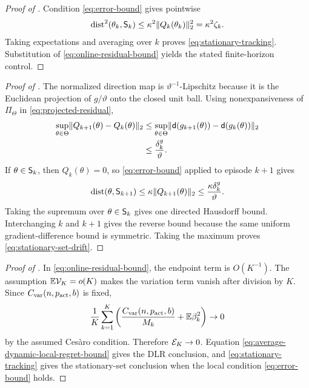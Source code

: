\begin{proof}[Proof of ]
Condition \eqref{eq:error-bound} gives pointwise
\[
 \operatorname{dist}^2(\theta_k,\mathsf S_k)
 \le\kappa^2\lVert Q_k(\theta_k)\rVert_2^2
 =\kappa^2\zeta_k.
\]
Taking expectations and averaging over $k$ proves \eqref{eq:stationary-tracking}.  Substitution of \eqref{eq:online-residual-bound} yields the stated finite-horizon control.
\end{proof}

\begin{proof}[Proof of ]
The normalized direction map is $\vartheta^{-1}$-Lipschitz because it is the Euclidean projection of $g/\vartheta$ onto the closed unit ball.  Using nonexpansiveness of $\Pi_\Theta$ in \eqref{eq:projected-residual},
\begin{align*}
 \sup_{\theta\in\Theta}
 \lVert Q_{k+1}(\theta)-Q_k(\theta)\rVert_2
 &\le
 \sup_{\theta\in\Theta}
 \lVert\mathsf d(g_{k+1}(\theta))-\mathsf d(g_k(\theta))\rVert_2\\
 &\le\frac{\delta_k^g}{\vartheta}.
\end{align*}
If $\theta\in\mathsf S_k$, then $Q_k(\theta)=0$, so \eqref{eq:error-bound} applied to episode $k+1$ gives
\[
 \operatorname{dist}(\theta,\mathsf S_{k+1})
 \le\kappa\lVert Q_{k+1}(\theta)\rVert_2
 \le\frac{\kappa\delta_k^g}{\vartheta}.
\]
Taking the supremum over $\theta\in\mathsf S_k$ gives one directed Hausdorff bound.  Interchanging $k$ and $k+1$ gives the reverse bound because the same uniform gradient-difference bound is symmetric.  Taking the maximum proves \eqref{eq:stationary-set-drift}.
\end{proof}

\begin{proof}[Proof of ]
In \eqref{eq:online-residual-bound}, the endpoint term is $O(K^{-1})$.  The assumption $\mathbb E\mathcal V_K=o(K)$ makes the variation term vanish after division by $K$.  Since $C_{\rm var}(n,p_{\rm act},b)$ is fixed,
\[
 \frac1K\sum_{k=1}^{K}\left(\frac{C_{\rm var}(n,p_{\rm act},b)}{M_k}+\mathbb E\beta_k^2\right)\to0
\]
by the assumed Ces\`aro condition.  Therefore $\mathcal E_K\to0$.  Equation \eqref{eq:average-dynamic-local-regret-bound} gives the DLR conclusion, and \eqref{eq:stationary-tracking} gives the stationary-set conclusion when the local condition \eqref{eq:error-bound} holds.
\end{proof}

